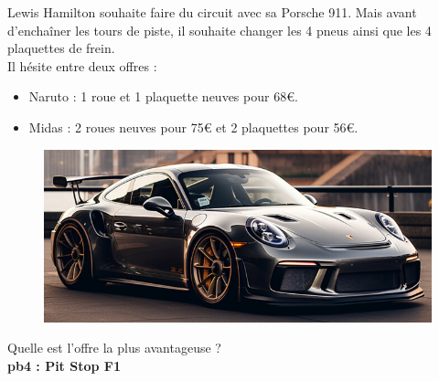 \begin{multicols}{2} 

Lewis Hamilton souhaite faire du circuit avec sa Porsche 911. Mais avant d'enchaîner les tours de piste, il souhaite changer les 4 pneus ainsi que les 4 plaquettes de frein. \\

Il hésite entre deux offres : 

\begin{itemize}[label={$\bullet$}]
  \item Naruto : 1 roue et 1 plaquette neuves pour 68€.
  \item Midas : 2 roues neuves pour 75€ et 2 plaquettes pour 56€. 
\end{itemize} \columnbreak

\begin{figure}[H]
  \centering
  \includegraphics[width=0.9\linewidth]{5x2-inegalite-triangulaire/porsche.png}
\end{figure} 
\end{multicols}

Quelle est l'offre la plus avantageuse ?\\

\textbf{pb4 : Pit Stop F1} \\

